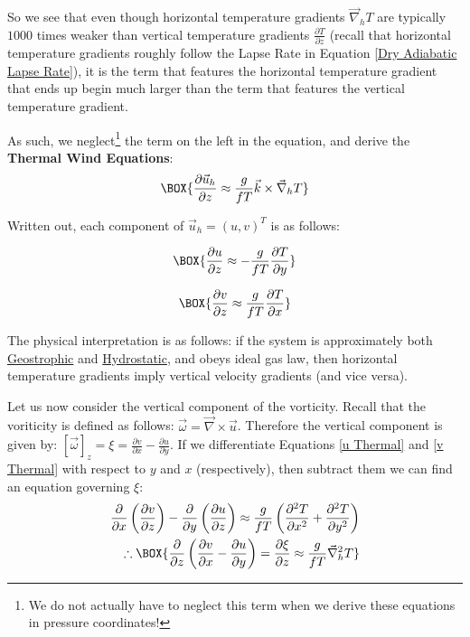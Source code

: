 So we see that even though horizontal temperature gradients $\vec{\nabla}_h T$ are typically $1000$ times weaker than vertical temperature gradients $\frac{\partial T}{\partial z}$ (recall that horizontal temperature gradients roughly follow the Lapse Rate in Equation \ref{Dry Adiabatic Lapse Rate}), it is the term that features the horizontal temperature gradient that ends up begin much larger than the term that features the vertical temperature gradient.

As such, we neglect\footnote{
    We do not actually have to neglect this term when we derive these equations in pressure coordinates!
} the term on the left in the equation, and derive the \textbf{Thermal Wind Equations}:
\begin{align}\label{Thermal Wind}
    \BOX{\frac{\partial\vec{u}_h}{\partial z}\approx\frac{g}{fT}\vec{k}\times\vec{\nabla}_hT}
\end{align}

Written out, each component of $\vec{u}_h=(u,v)^T$ is as follows:

\begin{minipage}{0.45\linewidth}
    \begin{align}
        \label{u Thermal}
        \BOX{\frac{\partial u}{\partial z} \approx-\frac{g}{f T}\frac{\partial T}{\partial y}}
    \end{align}
\end{minipage}
\hfill
\begin{minipage}{0.45\linewidth}
    \begin{align}
        \label{v Thermal}
        \BOX{\frac{\partial v}{\partial z} \approx \frac{g}{f T}\frac{\partial T}{\partial x}}
    \end{align}
\end{minipage}

The physical interpretation is as follows: if the system is approximately both \hyperref[Geostrophic Box]{Geostrophic} and \hyperref[Hydrostatic GFD Box]{Hydrostatic}, and obeys ideal gas law, then horizontal temperature gradients imply vertical velocity gradients (and vice versa).

Let us now consider the vertical component of the vorticity. Recall that the voriticity is defined as follows: $\vec{\omega}=\vec{\nabla}\times\vec{u}$. Therefore the vertical component is given by: $[\vec{\omega}]_z=\xi=\frac{\partial v}{\partial x}-\frac{\partial u}{\partial y}$. If we differentiate Equations \ref{u Thermal} and \ref{v Thermal} with respect to $y$ and $x$ (respectively), then subtract them we can find an equation governing $\xi$:
\begin{align}
    \frac{\partial}{\partial x}\left( \frac{\partial v}{\partial z} \right) - \frac{\partial}{\partial y}\left( \frac{\partial u}{\partial z} \right)
    \approx
    \frac{g}{fT}\left( 
        \frac{\partial^2 T}{\partial x^2}+\frac{\partial^2 T}{\partial y^2}
     \right)\nonumber
     \\
    \label{Thermal Wind Vorticity}
    \therefore
    \BOX{
        \frac{\partial}{\partial z}\left( \frac{\partial v}{\partial x}- \frac{\partial u}{\partial y} \right)=
        \frac{\partial \xi}{\partial z}
        \approx
        \frac{g}{fT}\vec{\nabla}_h^2 T
    }
\end{align}

